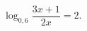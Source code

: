 \begin{ex}[type=equation]
	\begin{condition}
		$\log_{0,6} \dfrac{3x + 1}{2x}= 2 .$
	\end{condition}
\end{ex}